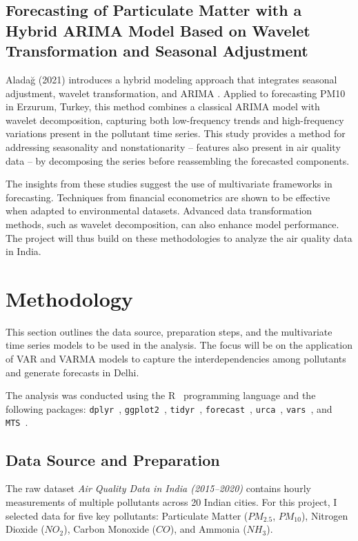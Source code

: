 \documentclass[fleqn,10pt]{SelfArx} %
\begin{document}
\subsection*{Forecasting of Particulate Matter with a Hybrid ARIMA Model Based on Wavelet Transformation and Seasonal Adjustment}
Aladağ (2021) introduces a hybrid modeling approach that integrates seasonal adjustment, wavelet transformation, and ARIMA \cite{aladag2021}. Applied to forecasting PM10 in Erzurum, Turkey, this method combines a classical ARIMA model with wavelet decomposition, capturing both low-frequency trends and high-frequency variations present in the pollutant time series. This study provides a method for addressing seasonality and nonstationarity -- features also present in air quality data -- by decomposing the series before reassembling the forecasted components.

\medskip

The insights from these studies suggest the use of multivariate frameworks in forecasting. Techniques from financial econometrics are shown to be effective when adapted to environmental datasets. Advanced data transformation methods, such as wavelet decomposition, can also enhance model performance. The project will thus build on these methodologies to analyze the air quality data in India.


\section{Methodology}
This section outlines the data source, preparation steps, and the multivariate time series models to be used in the analysis. The focus will be on the application of VAR and VARMA models to capture the interdependencies among pollutants and generate forecasts in Delhi.

The analysis was conducted using the R~\cite{RCoreTeam2025} programming language and the following packages: \texttt{dplyr}~\cite{dplyr}, \texttt{ggplot2}~\cite{ggplot2}, \texttt{tidyr}~\cite{tidyr}, \texttt{forecast}~\cite{forecast}, \texttt{urca}~\cite{urca}, \texttt{vars}~\cite{vars}, and \texttt{MTS}~\cite{MTS}.

\subsection{Data Source and Preparation}
The raw dataset \textit{Air Quality Data in India (2015--2020)} contains hourly measurements of multiple pollutants across 20 Indian cities. For this project, I selected data for five key pollutants: Particulate Matter ($PM_{2.5}$, $PM_{10}$), Nitrogen Dioxide ($NO_2$), Carbon Monoxide ($CO$), and Ammonia ($NH_3$).
\end{document}
